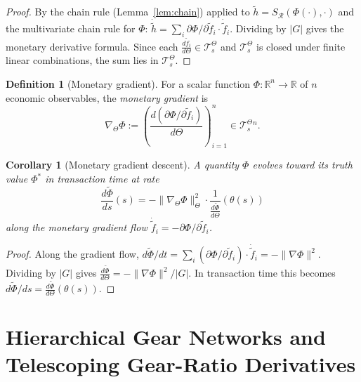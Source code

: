\documentclass[twocolumn,11pt,a4paper]{article}
\theoremstyle{thmstyle}
\newtheorem{corollary}[theorem]{Corollary}
\theoremstyle{definition}
\newtheorem{definition}[theorem]{Definition}
\theoremstyle{remark}
\newcommand{\Gain}{G}                        %
\newcommand{\Clock}{\Theta}                  %
\newcommand{\InvClock}{\theta}               %
\newcommand{\Mdiff}[1]{\frac{d#1}{d\Clock}} %
\newcommand{\Sval}{S}                        %
\newcommand{\Mtan}{\mathcal{T}^{\Clock}}     %
\newcommand{\Real}{\mathbb{R}}
\begin{document}
\begin{proof}
By the chain rule (Lemma~\ref{lem:chain}) applied to
$\tilde{h} = \Sval_{\mathcal{R}}(\Phi(\cdot),\cdot)$ and
the multivariate chain rule for $\Phi$:
$\dot{\tilde{h}} = \sum_{i}\partial\Phi/\partial\tilde{f}_{i}
\cdot\dot{\tilde{f}}_{i}$.  Dividing by $|\Gain|$ gives
the monetary derivative formula.  Since each
$\Mdiff{\tilde{f}_{i}}\in\Mtan_{s}$ and $\Mtan_{s}$ is
closed under finite linear combinations, the sum lies in
$\Mtan_{s}$.
\end{proof}

\begin{definition}[Monetary gradient]\label{def:mgradient}
For a scalar function $\Phi:\Real^{n}\to\Real$ of $n$
economic observables, the \emph{monetary gradient} is
\begin{equation}
  \nabla_{\Clock}\Phi
  := \left(\Mdiff{(\partial\Phi/\partial\tilde{f}_{i})}\right)_{i=1}^{n}
  \in \Mtan_{s}^{n}.
\end{equation}
\end{definition}

\begin{corollary}[Monetary gradient descent]\label{cor:mgd}
A quantity $\Phi$ evolves toward its truth value $\Phi^{*}$
in transaction time at rate
\begin{equation}
  \frac{d\tilde\Phi}{ds}(s)
  = -\|\nabla_{\Clock}\Phi\|_{\Clock}^{2}
    \cdot\frac{1}{\Mdiff{\tilde\Phi}}(\InvClock(s))
\end{equation}
along the monetary gradient flow
$\dot{\tilde{f}}_{i} = -\partial\Phi/\partial\tilde{f}_{i}$.
\end{corollary}

\begin{proof}
Along the gradient flow,
$d\tilde\Phi/dt = \sum_{i}(\partial\Phi/\partial\tilde{f}_{i})
\cdot\dot{\tilde{f}}_{i} = -\|\nabla\Phi\|^{2}$.  Dividing
by $|\Gain|$ gives $\Mdiff{\tilde\Phi} = -\|\nabla\Phi\|^{2}/|\Gain|$.
In transaction time this becomes
$d\tilde\Phi/ds = \Mdiff{\tilde\Phi}(\InvClock(s))$.
\end{proof}


\section{Hierarchical Gear Networks and Telescoping
         Gear-Ratio Derivatives}
\label{sec:gear}
\end{document}
